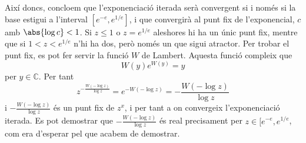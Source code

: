 \documentclass[12pt,a4paper]{article}
\begin{document}
Així doncs, concloem que l'exponenciació iterada serà convergent si i només si la base estigui a l'interval \( [e^{-e}, e^{1/e}] \), i que convergirà al punt fix de l'exponencial, \( c \) amb \( \abs{\log{c}} < 1 \). Si \( z \leq 1 \) o \( z = e^{1/e} \) aleshores hi ha un únic punt fix, mentre que si \( 1 < z < e^{1/e} \) n'hi ha dos, però només un que sigui atractor. Per trobar el punt fix, es pot fer servir la funció \( W \) de Lambert. Aquesta funció compleix que 
\begin{equation*}
	W(y)e^{W(y)} = y
\end{equation*}
per \( y \in \mathbb{C} \). Per tant
\begin{equation*}
	z^{-\frac{W(-\log{z})}{\log{z}}} = e^{-W(-\log{z})} = -\frac{W(-\log{z})}{\log{z}}
\end{equation*}
i \( -\frac{W(-\log{z})}{\log{z}} \) és un punt fix de \( z^x \), i per tant a on convergeix l'exponenciació iterada. Es pot demostrar que \( -\frac{W(-\log{z})}{\log{z}} \) és real precisament per \( z \in [e^{-e}, e^{1/e} \), com era d'esperar pel que acabem de demostrar. 
\end{document}
